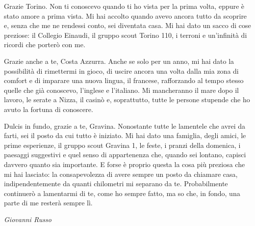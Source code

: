 Grazie Torino. Non ti conoscevo quando ti ho vista per la prima volta, eppure è stato amore a prima vista. Mi hai accolto quando avevo ancora tutto da scoprire e, senza che me ne rendessi conto, sei diventata casa. Mi hai dato un sacco di cose preziose: il Collegio Einaudi, il gruppo scout Torino 110, i terroni e un'infinità di ricordi che porterò con me.

Grazie anche a te, Costa Azzurra. Anche se solo per un anno, mi hai dato la possibilità di rimettermi in gioco, di uscire ancora una volta dalla mia zona di comfort e di imparare una nuova lingua, il francese, rafforzando al tempo stesso quelle che già conoscevo, l'inglese e l'italiano. Mi mancheranno il mare dopo il lavoro, le serate a Nizza, il casinò e, soprattutto, tutte le persone stupende che ho avuto la fortuna di conoscere.

Dulcis in fundo, grazie a te, Gravina. Nonostante tutte le lamentele che avrei da farti, sei il posto da cui tutto è iniziato. Mi hai dato una famiglia, degli amici, le prime esperienze, il gruppo scout Gravina 1, le feste, i pranzi della domenica, i paesaggi suggestivi e quel senso di appartenenza che, quando sei lontano, capisci davvero quanto sia importante. E forse è proprio questa la cosa più preziosa che mi hai lasciato: la consapevolezza di avere sempre un posto da chiamare casa, indipendentemente da quanti chilometri mi separano da te. Probabilmente continuerò a lamentarmi di te, come ho sempre fatto, ma so che, in fondo, una parte di me resterà sempre lì.

\begin{flushright}
{\itshape Giovanni Russo}
\end{flushright}
